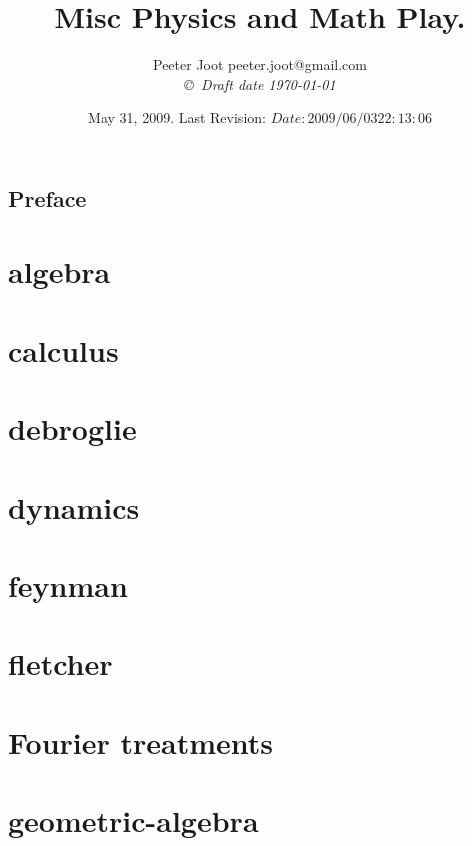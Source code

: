 \documentclass[12pt,leqno]{book}
\title{Misc Physics and Math Play.}
\author{Peeter Joot  \quad peeter.joot@gmail.com \\
{\small\em \copyright \  Draft date \today }}
\date{ May 31, 2009.  Last Revision: $Date: 2009/06/03 22:13:06 $ }
\begin{document}
\maketitle
\tableofcontents
\listoffigures
\listoftables
\chapter*{Preface}\normalsize
\pagestyle{plain}

%
\pagestyle{headings}


\part{algebra}



\part{calculus}



\part{debroglie}


\part{dynamics}


\part{feynman}


\part{fletcher}


\part{Fourier treatments}


\part{geometric-algebra}


















\end{document}
